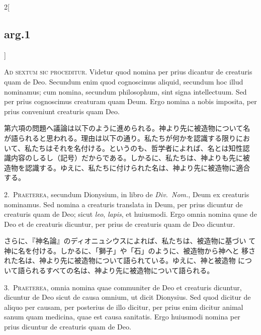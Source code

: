 \documentclass[paper=a4paper,fontsize=10pt,jafontsize=9pt,titlepage]{jlreq}
\begin{document}
\begin{paracol}{2}[\subsection{arg.1}]

{\huge A}{\scshape d sextum sic proceditur}. Videtur quod nomina per
prius dicantur de creaturis quam de Deo. Secundum enim quod
cognoscimus aliquid, secundum hoc illud nominamus; cum nomina,
secundum philosophum, sint signa intellectuum. Sed per prius
cognoscimus creaturam quam Deum. Ergo nomina a nobis imposita, per
prius conveniunt creaturis quam Deo.

\switchcolumn

第六項の問題へ議論は以下のように進められる。神より先に被造物について名
が語られると思われる。理由は以下の通り。私たちが何かを認識する限りにお
いて、私たちはそれを名付ける。というのも、哲学者によれば、名とは知性認
識内容のしるし（記号）だからである。しかるに、私たちは、神よりも先に被
造物を認識する。ゆえに、私たちに付けられた名は、神より先に被造物に適合
する。


2.~{\scshape Praeterea}, secundum Dionysium, in libro de {\itshape
Div.~Nom.}, Deum ex creaturis nominamus. Sed nomina a creaturis
translata in Deum, per prius dicuntur de creaturis quam de Deo; sicut
{\itshape leo}, {\itshape lapis}, et huiusmodi. Ergo omnia nomina quae
de Deo et de creaturis dicuntur, per prius de creaturis quam de Deo
dicuntur.

\switchcolumn

さらに、『神名論』のディオニュシウスによれば、私たちは、被造物に基づい
て神に名を付ける。しかるに、「獅子」や「石」のように、被造物から神へと
移された名は、神より先に被造物について語られている。ゆえに、神と被造物
について語られるすべての名は、神より先に被造物について語られる。


3.~{\scshape Praeterea}, omnia nomina quae communiter de Deo et
creaturis dicuntur, dicuntur de Deo sicut de causa omnium, ut dicit
Dionysius. Sed quod dicitur de aliquo per causam, per posterius de
illo dicitur, per prius enim dicitur animal sanum quam medicina, quae
est causa sanitatis. Ergo huiusmodi nomina per prius dicuntur de
creaturis quam de Deo.


\end{paracol}
\end{document}
